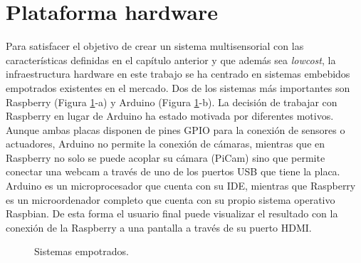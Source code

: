 \section{Plataforma hardware}
\label{sec:hw}
Para satisfacer el objetivo de crear un sistema multisensorial con las características definidas en el capítulo anterior y que además sea \textit{lowcost}, la infraestructura hardware en este trabajo se ha centrado en sistemas embebidos empotrados existentes en el mercado. Dos de los sistemas más importantes son Raspberry (Figura \ref{fig:placas}-a) y Arduino (Figura \ref{fig:placas}-b). La decisión de trabajar con Raspberry en lugar de Arduino ha estado motivada por diferentes motivos. Aunque ambas placas disponen de pines GPIO para la conexión de sensores o actuadores, Arduino no permite la conexión de cámaras, mientras que en Raspberry no solo se puede acoplar su cámara (PiCam) sino que permite conectar una webcam a través de uno de los puertos USB que tiene la placa. Arduino es un microprocesador que cuenta con su IDE, mientras que Raspberry es un microordenador completo que cuenta con su propio sistema operativo Raspbian. De esta forma el usuario final puede visualizar el resultado con la conexión de la Raspberry a una pantalla a través de su puerto HDMI.\\
\begin{figure}[h!]
  \begin{center}
    \hspace{2mm}
  \end{center}
\caption{Sistemas empotrados.} \label{fig:placas}
\end{figure}

